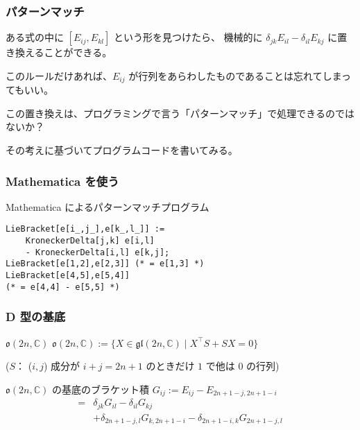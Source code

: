 \documentclass{beamer}
\begin{document}
\begin{frame}
    \frametitle{パターンマッチ}

    ある式の中に \([E_{ij}, E_{kl}]\) という形を見つけたら、
    機械的に \(\delta_{jk}E_{il} - \delta_{il}E_{kj}\) に置き換えることができる。

    このルールだけあれば、\(E_{ij}\) が行列をあらわしたものであることは忘れてしまってもいい。

    \bigskip

    この置き換えは、プログラミングで言う「パターンマッチ」で処理できるのではないか？

    その考えに基づいてプログラムコードを書いてみる。
\end{frame}

\begin{frame}[fragile]
    \frametitle{Mathematica を使う}

    \begin{exampleblock}{Mathematica によるパターンマッチプログラム}
        \begin{lstlisting}
LieBracket[e[i_,j_],e[k_,l_]] :=
    KroneckerDelta[j,k] e[i,l]
    - KroneckerDelta[i,l] e[k,j];
LieBracket[e[1,2],e[2,3]] (* = e[1,3] *)
LieBracket[e[4,5],e[5,4]]
(* = e[4,4] - e[5,5] *)
        \end{lstlisting}
    \end{exampleblock}
\end{frame}

\begin{frame}
    \frametitle{D 型の基底}

    \begin{block}{\(\mathfrak{o}(2n,\mathbb{C})\)}
        \(\mathfrak{o}(2n,\mathbb{C}) := \{ X \in \mathfrak{gl}(2n,\mathbb{C}) \mid X^{\intercal}S + SX = 0 \} \)

        (\(S\)： (\(i,j\)) 成分が \(i + j = 2n + 1\) のときだけ \(1\) で他は \(0\) の行列)
    \end{block}

    \begin{block}{\(\mathfrak{o}(2n,\mathbb{C})\) の基底のブラケット積}
        \(G_{ij} := E_{ij} - E_{2n+1-j,2n+1-i}\)
        \begin{align*}
            [G_{ij}, G_{kl}] = & \delta_{jk}G_{il} - \delta_{il}G_{kj} \\
                               & + \delta_{2n+1-j,l}G_{k,2n+1-i} - \delta_{2n+1-i,k}G_{2n+1-j,l}
        \end{align*}
    \end{block}
\end{frame}
\end{document}
